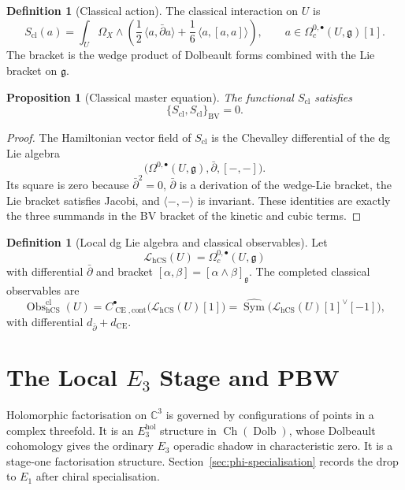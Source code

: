 \documentclass[11pt]{article}
\providecommand{\C}{\mathbb{C}}
\providecommand{\dbar}{\bar{\partial}}
\providecommand{\fg}{\mathfrak{g}}
\providecommand{\Sym}{\operatorname{Sym}}
\providecommand{\Obs}{\operatorname{Obs}}
\providecommand{\CE}{\operatorname{CE}}
\providecommand{\BV}{\operatorname{BV}}
\providecommand{\hCS}{\operatorname{hCS}}
\providecommand{\Ch}{\operatorname{Ch}}
\providecommand{\Dolb}{\operatorname{Dolb}}
\providecommand{\cL}{\mathcal{L}}
\theoremstyle{plain}
\newtheorem{proposition}[theorem]{Proposition}
\theoremstyle{definition}
\newtheorem{definition}[theorem]{Definition}
\theoremstyle{remark}
\begin{document}
\begin{definition}[Classical action]
\label{def:classical-action}
The classical interaction on \(U\) is
\[
  S_{\mathrm{cl}}(a)=
  \int_U\Omega_X\wedge
  \left(
    \frac12\,\langle a,\dbar a\rangle
    +\frac16\,\langle a,[a,a]\rangle
  \right),
  \qquad
  a\in\Omega^{0,\bullet}_c(U,\fg)[1].
\]
The bracket is the wedge product of Dolbeault forms combined with the
Lie bracket on \(\fg\).
\end{definition}

\begin{proposition}[Classical master equation]
\label{prop:cme}
The functional \(S_{\mathrm{cl}}\) satisfies
\[
  \{S_{\mathrm{cl}},S_{\mathrm{cl}}\}_{\BV}=0.
\]
\end{proposition}

\begin{proof}
The Hamiltonian vector field of \(S_{\mathrm{cl}}\) is the Chevalley
differential of the dg Lie algebra
\[
  \bigl(\Omega^{0,\bullet}(U,\fg),\dbar,[-,-]\bigr).
\]
Its square is zero because \(\dbar^2=0\), \(\dbar\) is a derivation of
the wedge-Lie bracket, the Lie bracket satisfies Jacobi, and
\(\langle-,-\rangle\) is invariant. These identities are exactly the
three summands in the BV bracket of the kinetic and cubic terms.
\end{proof}

\begin{definition}[Local dg Lie algebra and classical observables]
\label{def:local-lie-observables}
Let
\[
  \cL_{\hCS}(U)=\Omega^{0,\bullet}_c(U,\fg)
\]
with differential \(\dbar\) and bracket
\([\alpha,\beta]=[\alpha\wedge\beta]_\fg\). The completed classical
observables are
\[
  \Obs^{\mathrm{cl}}_{\hCS}(U)
  =
  C^\bullet_{\CE,\mathrm{cont}}\bigl(\cL_{\hCS}(U)[1]\bigr)
  =
  \widehat{\Sym}\bigl(\cL_{\hCS}(U)[1]^\vee[-1]\bigr),
\]
with differential \(d_{\dbar}+d_{\CE}\).
\end{definition}

\section{The Local \(E_3\) Stage and PBW}
\label{sec:e3-pbw}

Holomorphic factorisation on \(\C^3\) is governed by configurations of
points in a complex threefold. It is an \(E_3^{\mathrm{hol}}\) structure
in \(\Ch(\Dolb)\), whose Dolbeault cohomology gives the ordinary
\(E_3\) operadic shadow in characteristic zero. It is a stage-one
factorisation structure. Section~\ref{sec:phi-specialisation} records
the drop to \(E_1\) after chiral specialisation.
\end{document}
